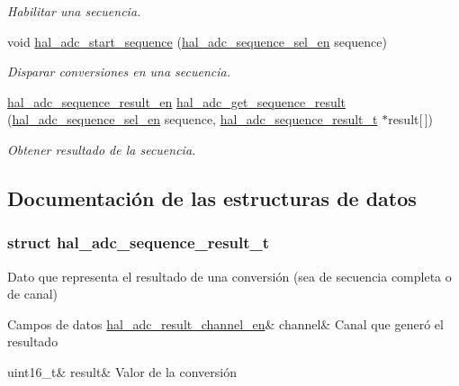 \begin{DoxyCompactItemize}
\begin{DoxyCompactList}\small\item\em Habilitar una secuencia. \end{DoxyCompactList}\item 
void \hyperlink{group__ADC_ga154950a81b5f589fde0139178ab1dcf3}{hal\+\_\+adc\+\_\+start\+\_\+sequence} (\hyperlink{group__ADC_ga9297d7b14d7018a94bce94f0103d8559}{hal\+\_\+adc\+\_\+sequence\+\_\+sel\+\_\+en} sequence)
\begin{DoxyCompactList}\small\item\em Disparar conversiones en una secuencia. \end{DoxyCompactList}\item 
\hyperlink{group__ADC_ga7761986f9c56b809bce1299c6c32eddd}{hal\+\_\+adc\+\_\+sequence\+\_\+result\+\_\+en} \hyperlink{group__ADC_ga2abe86b92546f8f4726dd65a7a9ddc0d}{hal\+\_\+adc\+\_\+get\+\_\+sequence\+\_\+result} (\hyperlink{group__ADC_ga9297d7b14d7018a94bce94f0103d8559}{hal\+\_\+adc\+\_\+sequence\+\_\+sel\+\_\+en} sequence, \hyperlink{group__ADC_structhal__adc__sequence__result__t}{hal\+\_\+adc\+\_\+sequence\+\_\+result\+\_\+t} $\ast$result\mbox{[}$\,$\mbox{]})
\begin{DoxyCompactList}\small\item\em Obtener resultado de la secuencia. \end{DoxyCompactList}\end{DoxyCompactItemize}


\subsection{Documentación de las estructuras de datos}
\label{structhal__adc__sequence__result__t}
\subsubsection{struct hal\+\_\+adc\+\_\+sequence\+\_\+result\+\_\+t}
Dato que representa el resultado de una conversión (sea de secuencia completa o de canal) \begin{DoxyFields}{Campos de datos}
\mbox{\label{group__ADC_a14b46f8d352b49c5be28cad8aafff2ba}} 
\hyperlink{group__ADC_ga99371f47be5b6b4b61c32a1ea86f2b6c}{hal\_adc\_result\_channel\_en}&
channel&
Canal que generó el resultado \\
\hline

\mbox{\label{group__ADC_a0971e3d432b7f1f283620cab047a7275}} 
uint16\_t&
result&
Valor de la conversión \\
\hline

\end{DoxyFields}


